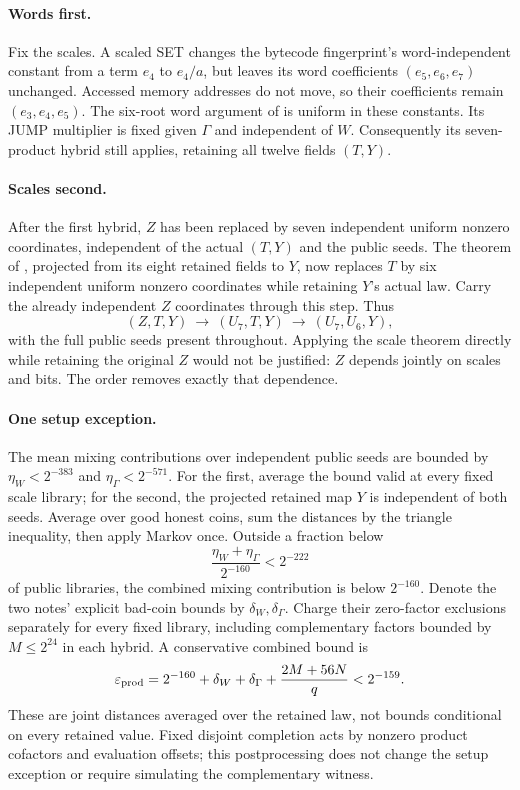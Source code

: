 \documentclass[11pt]{article}
\begin{document}
\paragraph{Words first.} Fix the scales. A scaled SET changes the bytecode fingerprint's word-independent constant from a term $e_4$ to $e_4/a$, but leaves its word coefficients $(e_5,e_6,e_7)$ unchanged. Accessed memory addresses do not move, so their coefficients remain $(e_3,e_4,e_5)$. The six-root word argument of  is uniform in these constants. Its JUMP multiplier is fixed given $\Gamma$ and independent of $W$. Consequently its seven-product hybrid still applies, retaining all twelve fields $(T,Y)$.

\paragraph{Scales second.} After the first hybrid, $Z$ has been replaced by seven independent uniform nonzero coordinates, independent of the actual $(T,Y)$ and the public seeds. The theorem of , projected from its eight retained fields to $Y$, now replaces $T$ by six independent uniform nonzero coordinates while retaining $Y$'s actual law. Carry the already independent $Z$ coordinates through this step. Thus
\[
 (Z,T,Y)\ \longrightarrow\ (U_7,T,Y)\
           \longrightarrow\ (U_7,U_6,Y),
\]
with the full public seeds present throughout. Applying the scale theorem directly while retaining the original $Z$ would not be justified: $Z$ depends jointly on scales and bits. The order removes exactly that dependence.

\paragraph{One setup exception.} The mean mixing contributions over independent public seeds are bounded by $\eta_W<2^{-383}$ and $\eta_\Gamma<2^{-571}$. For the first, average the bound valid at every fixed scale library; for the second, the projected retained map $Y$ is independent of both seeds. Average over good honest coins, sum the distances by the triangle inequality, then apply Markov once. Outside a fraction below
\[
 \frac{\eta_W+\eta_\Gamma}{2^{-160}}<2^{-222}
\]
of public libraries, the combined mixing contribution is below $2^{-160}$. Denote the two notes' explicit bad-coin bounds by $\delta_W,\delta_\Gamma$. Charge their zero-factor exclusions separately for every fixed library, including complementary factors bounded by $M\le2^{24}$ in each hybrid. A conservative combined bound is
\[
 \varepsilon_{\rm prod}
 =2^{-160}+\delta_W+\delta_\Gamma+\frac{2M+56N}{q}
 <2^{-159}.
\]
These are joint distances averaged over the retained law, not bounds conditional on every retained value. Fixed disjoint completion acts by nonzero product cofactors and evaluation offsets; this postprocessing does not change the setup exception or require simulating the complementary witness.
\end{document}
